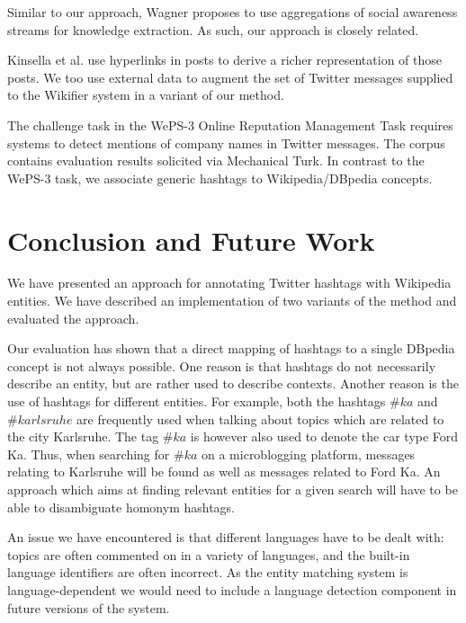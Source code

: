 \documentclass{llncs}
\begin{document}
Similar to our approach, Wagner \cite{key:clauwa} proposes to use aggregations of social awareness streams for knowledge extraction. As such, our approach is closely related.

Kinsella et al. \cite{key:kinsella} use hyperlinks in posts to derive a richer representation of those posts. We too use external data to augment the set of Twitter messages supplied to the Wikifier system in a variant of our method.

The challenge task in the WePS-3 Online Reputation Management Task\cite{key:clef} requires systems to detect mentions of company names in Twitter messages.
The corpus contains evaluation results solicited via Mechanical Turk. In contrast to the WePS-3 task, we associate generic hashtags to Wikipedia/DBpedia concepts.


\section{Conclusion and Future Work}
\label{sect:conclusion}

We have presented an approach for annotating Twitter hashtags with Wikipedia entities.
We have described an implementation of two variants of the method and evaluated the approach.

Our evaluation has shown that a direct mapping of hashtags to a single DBpedia concept is not always possible.
One reason is that hashtags do not necessarily describe an entity, but are rather used to describe contexts.
Another reason is the use of hashtags for different entities.
For example, both the hashtags $\#ka$ and $\#karlsruhe$ are frequently used when talking about topics which are related to the city Karlsruhe.
The tag $\#ka$ is however also used to denote the car type Ford Ka.
Thus, when searching for $\#ka$ on a microblogging platform, messages relating to Karlsruhe will be found as well as messages related to Ford Ka.
An approach which aims at finding relevant entities for a given search will have to be able to disambiguate homonym hashtags.

An issue we have encountered is that different languages have to be dealt with: topics are often commented on in a variety of languages, and the built-in language identifiers are often incorrect.
As the entity matching system is language-dependent we would need to include a language detection component in future versions of the system.






\end{document}
